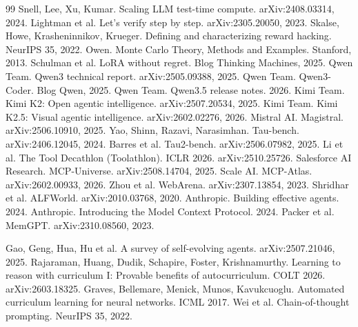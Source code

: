 \begin{thebibliography}{99}
 Snell, Lee, Xu, Kumar. Scaling LLM test-time compute. arXiv:2408.03314, 2024.
 Lightman et al. Let's verify step by step. arXiv:2305.20050, 2023.
 Skalse, Howe, Krasheninnikov, Krueger. Defining and characterizing reward hacking. NeurIPS 35, 2022.
 Owen. Monte Carlo Theory, Methods and Examples. Stanford, 2013.
 Schulman et al. LoRA without regret. Blog Thinking Machines, 2025.
 Qwen Team. Qwen3 technical report. arXiv:2505.09388, 2025.
 Qwen Team. Qwen3-Coder. Blog Qwen, 2025.
 Qwen Team. Qwen3.5 release notes. 2026. %
 Kimi Team. Kimi K2: Open agentic intelligence. arXiv:2507.20534, 2025.
 Kimi Team. Kimi K2.5: Visual agentic intelligence. arXiv:2602.02276, 2026.
 Mistral AI. Magistral. arXiv:2506.10910, 2025.
 Yao, Shinn, Razavi, Narasimhan. Tau-bench. arXiv:2406.12045, 2024.
 Barres et al. Tau2-bench. arXiv:2506.07982, 2025.
 Li et al. The Tool Decathlon (Toolathlon). ICLR 2026. arXiv:2510.25726.
 Salesforce AI Research. MCP-Universe. arXiv:2508.14704, 2025.
 Scale AI. MCP-Atlas. arXiv:2602.00933, 2026.
 Zhou et al. WebArena. arXiv:2307.13854, 2023.
 Shridhar et al. ALFWorld. arXiv:2010.03768, 2020.
 Anthropic. Building effective agents. 2024.
 Anthropic. Introducing the Model Context Protocol. 2024.
 Packer et al. MemGPT. arXiv:2310.08560, 2023.

 Gao, Geng, Hua, Hu et al. A survey of self-evolving agents. arXiv:2507.21046, 2025.
 Rajaraman, Huang, Dudik, Schapire, Foster, Krishnamurthy. Learning to reason with curriculum I: Provable benefits of autocurriculum. COLT 2026. arXiv:2603.18325.
 Graves, Bellemare, Menick, Munos, Kavukcuoglu. Automated curriculum learning for neural networks. ICML 2017.
 Wei et al. Chain-of-thought prompting. NeurIPS 35, 2022.


\end{thebibliography}
